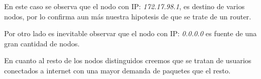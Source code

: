 En este caso se observa que el nodo con IP: \textit{172.17.98.1}, es destino de varios nodos, por lo confirma aun más nuestra hipotesis de que se trate de un router.

Por otro lado es inevitable observar que el nodo con IP: \textit{0.0.0.0} es fuente de una gran cantidad de nodos.

En cuanto al resto de los nodos distinguidos creemos que se tratan de usuarios conectados a internet con una mayor demanda de paquetes que el resto.
